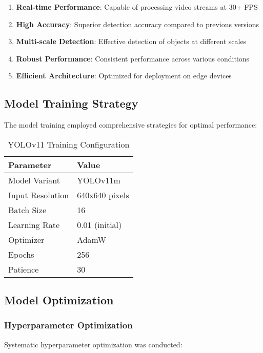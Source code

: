 \begin{enumerate}
    \item \textbf{Real-time Performance}: Capable of processing video streams at 30+ FPS
    \item \textbf{High Accuracy}: Superior detection accuracy compared to previous versions
    \item \textbf{Multi-scale Detection}: Effective detection of objects at different scales
    \item \textbf{Robust Performance}: Consistent performance across various conditions
    \item \textbf{Efficient Architecture}: Optimized for deployment on edge devices
\end{enumerate}

\subsection{Model Training Strategy}

The model training employed comprehensive strategies for optimal performance:

\begin{table}[h]
\centering
\caption{YOLOv11 Training Configuration}
\begin{tabular}{|l|l|}
\hline
\textbf{Parameter} & \textbf{Value} \\
\hline
Model Variant & YOLOv11m \\
Input Resolution & 640x640 pixels \\
Batch Size & 16 \\
Learning Rate & 0.01 (initial) \\
Optimizer & AdamW \\
Epochs & 256 \\
Patience & 30 \\
\hline
\end{tabular}
\end{table}

\subsection{Model Optimization}

\subsubsection{Hyperparameter Optimization}

Systematic hyperparameter optimization was conducted:

